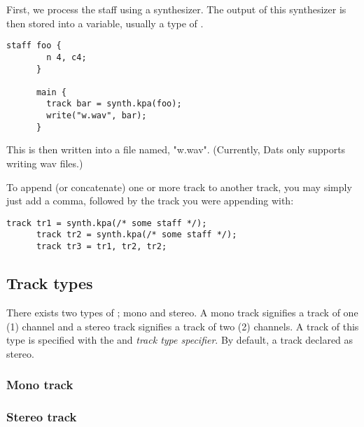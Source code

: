 \np First, we process the staff using a synthesizer. The output of this synthesizer
is then stored into a variable, usually a type of .

\begin{Verbatim}[frame=single]
      staff foo {
        n 4, c4;
      }

      main {
        track bar = synth.kpa(foo);
        write("w.wav", bar);
      }
\end{Verbatim}

\np This is then written into a file named, "w.wav". (Currently, Dats only supports writing wav files.)

\np To append (or concatenate) one or more track to another track, you may simply just add a comma, followed by the track
you were appending with:

\begin{Verbatim}[frame=single]
      track tr1 = synth.kpa(/* some staff */);
      track tr2 = synth.kpa(/* some staff */);
      track tr3 = tr1, tr2, tr2;
\end{Verbatim}

\subsection{Track types}

\np There exists two types of ; mono and stereo. A mono track signifies a track
of one (1) channel and a stereo track signifies a track of two (2) channels.
A track of this type is specified with the  and 
\textit{track type specifier}. By default, a track declared as stereo.

\np 

\subsubsection{Mono track}
\subsubsection{Stereo track}





